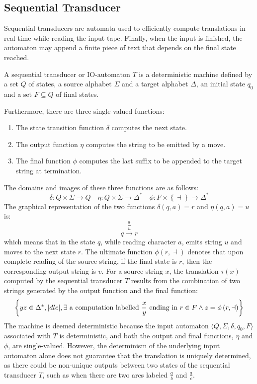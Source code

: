 \subsection{Sequential Transducer}
Sequential transducers are automata used to efficiently compute translations in real-time while reading the input tape. 
Finally, when the input is finished, the automaton may append a finite piece of text that depends on the final state reached.
\begin{definition}
    A sequential transducer or IO-automaton $T$ is a deterministic machine defined by a set $Q$ of states, a source alphabet $\Sigma$ and a target alphabet $\Delta$, an initial state $q_0$ and a set $F \subseteq Q$ of final states.
\end{definition}
Furthermore, there are three single-valued functions:
\begin{enumerate}
    \item The state transition function $\delta$ computes the next state.
    \item The output function $\eta$ computes the string to be emitted by a move.
    \item The final function $\phi$ computes the last suffix to be appended to the target string at termination.
\end{enumerate}
The domains and images of these three functions are as follows:
\[ \delta: Q \times \Sigma \rightarrow Q \quad \eta: Q \times \Sigma \rightarrow \Delta^{*} \quad \phi : F \times \left\{ \dashv \right\} \rightarrow \Delta^{*} \]
The graphical representation of the two functions $\delta(q, a) = r$ and $\eta(q, a) = u$ is:
\[ q \xrightarrow{\dfrac{a}{u}} r \]
which means that in the state $q$, while reading character $a$, emits string $u$ and moves to the next state $r$.
The ultimate function $\phi(r, \dashv)$ denotes that upon complete reading of the source string, if the final state is $r$, then the corresponding output string is $v$.
For a source string $x$, the translation $\tau(x)$ computed by the sequential transducer $T$ results from the combination of two strings generated by the output function and the final function:
\[ \left\{ yz \in \Delta^{*} , |dle\vert , \exists  \textnormal{ a computation labelled } \dfrac{x}{y} \textnormal{ ending in } r \in F \land z = \phi\left( r, \dashv \right) \right\} \]
The machine is deemed deterministic because the input automaton $\langle Q, \Sigma, \delta, q_0, F \rangle$ associated with $T$ is deterministic, and both the output and final functions, $\eta$ and $\phi$, are single-valued.
However, the determinism of the underlying input automaton alone does not guarantee that the translation is uniquely determined, as there could be non-unique outputs between two states of the sequential transducer $T$, such as when there are two arcs labeled $\frac{a}{b}$ and $\frac{a}{c}$.

